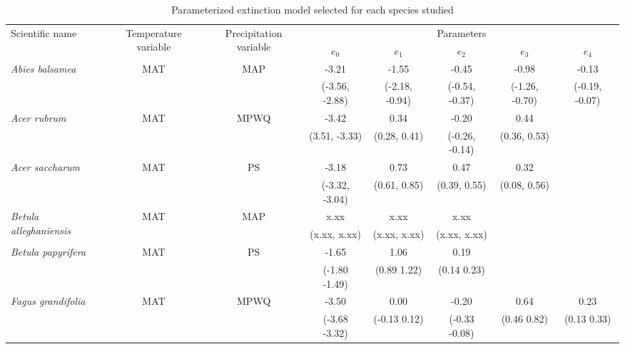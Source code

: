 \documentclass[11pt]{article}
\begin{document}

\newcommand{\ts}{\scriptsize}
\begin{table}[tb]
\small
\begin{threeparttable}
\label{tab:model_selection}
\caption{Parameterized extinction model selected for each species studied}
\begin{tabular}{lccccccc}
\toprule
\multirow{2}{*}{Scientific name} & \multirow{2}{2cm}{\centering Temperature variable\tnote{*}} & 
\multirow{2}{2cm}{\centering Precipitation variable\tnote{\textdagger}} & \multicolumn{5}{c}{Parameters\tnote{\textdaggerdbl}} \\
& & & $e_0$ & $e_1$ & $e_2$ & $e_3$ & $e_4$ \\ 
\midrule

\multirow{2}{*}{\it Abies balsamea} & \multirow{2}{*}{MAT} & \multirow{2}{*}{MAP} & -3.21\tnote{\textsection} & -1.55 & -0.45 & -0.98 & -0.13 \\
&  &  & {\ts (-3.56, -2.88)} & {\ts (-2.18, -0.94)} & {\ts (-0.54, -0.37)} & {\ts (-1.26, -0.70)} & {\ts (-0.19, -0.07)} \\

\multirow{2}{*}{\it Acer rubrum} & \multirow{2}{*}{MAT} & \multirow{2}{*}{MPWQ} & -3.42 & 0.34 & -0.20 & 0.44 & \\
&  &  & {\ts (3.51, -3.33)} & {\ts (0.28, 0.41)} & {\ts (-0.26, -0.14)} & {\ts (0.36, 0.53)} &  \\

\multirow{2}{*}{\it Acer saccharum} & \multirow{2}{*}{MAT} & \multirow{2}{*}{PS} & -3.18 & 0.73 & 0.47 & 0.32 &  \\
&  &  & {\ts (-3.32, -3.04)} & {\ts (0.61, 0.85)} & {\ts (0.39, 0.55)} & {\ts (0.08, 0.56)} &  \\

\multirow{2}{*}{\it Betula alleghaniensis} & \multirow{2}{*}{MAT} & \multirow{2}{*}{MAP} & x.xx & x.xx & x.xx & & \\
&  &  & {\ts (x.xx, x.xx)} & {\ts (x.xx, x.xx)} & {\ts (x.xx, x.xx)} &  & \\

\multirow{2}{*}{\it Betula papyrifera} & \multirow{2}{*}{MAT} & \multirow{2}{*}{PS} & -1.65 & 1.06 & 0.19 &  &  \\
&  &  & {\ts (-1.80 -1.49)} & {\ts (0.89  1.22)} & {\ts (0.14  0.23)} &  &  \\

\multirow{2}{*}{\it Fagus grandifolia} & \multirow{2}{*}{MAT} & \multirow{2}{*}{MPWQ} & -3.50 & 0.00 & -0.20 & 0.64 & 0.23 \\
&  &  & {\ts (-3.68 -3.32)} & {\ts (-0.13  0.12)} & {\ts (-0.33 -0.08)} & {\ts (0.46  0.82)} & {\ts (0.13  0.33)} \\


\end{tabular}
\end{threeparttable}
\end{table}
\end{document}
